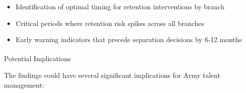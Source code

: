 \documentclass[./main.tex]{subfiles}
\makeatletter
\let\oldparagraph\paragraph
\renewcommand{\paragraph}{
    \@ifstar
      \xxxParagraphStar
      \xxxParagraphNoStar
  }
\newcommand{\xxxParagraphStar}[1]{\oldparagraph*{#1}\mbox{}}
\newcommand{\xxxParagraphNoStar}[1]{\oldparagraph{#1}\mbox{}}
\providecommand{\tightlist}{%
  \setlength{\itemsep}{0pt}\setlength{\parskip}{0pt}}
\makeatother
\begin{document}
\begin{enumerate}
  \begin{itemize}
  \tightlist
  \item
    Identification of optimal timing for retention interventions by
    branch
  \item
    Critical periods where retention risk spikes across all branches
  \item
    Early warning indicators that precede separation decisions by 6-12
    months
  \end{itemize}
\end{enumerate}

\paragraph{Potential Implications}\label{potential-implications}

The findings could have several significant implications for Army talent
management:
\end{document}
